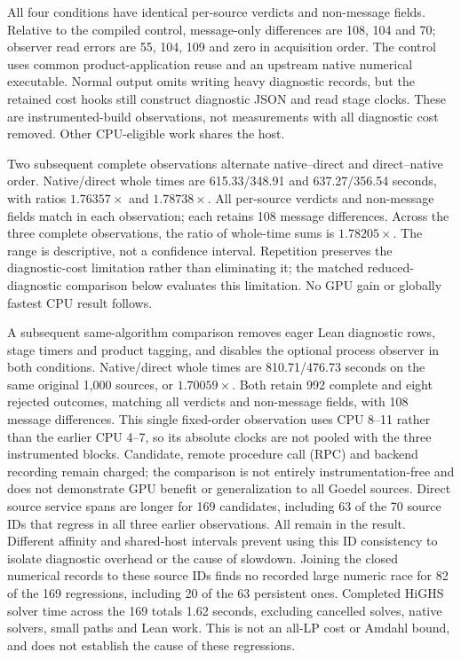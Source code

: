 \documentclass[10pt,twocolumn]{article}
\begin{document}
All four conditions have identical per-source verdicts and non-message fields.
Relative to the compiled control, message-only differences are 108, 104 and 70;
observer read errors are 55, 104, 109 and zero in acquisition order.
The control uses common product-application reuse and an upstream native
numerical executable. Normal output omits writing heavy diagnostic records,
but the retained cost hooks still construct diagnostic JSON and read stage
clocks. These are instrumented-build observations, not measurements with all
diagnostic cost removed. Other CPU-eligible work shares the host.

Two subsequent complete observations alternate native--direct and direct--native
order. Native/direct whole times are 615.33/348.91 and 637.27/356.54 seconds,
with ratios $1.76357\times$ and $1.78738\times$. All per-source verdicts and
non-message fields match in each observation; each retains 108 message
differences. Across the three complete observations, the ratio of whole-time
sums is $1.78205\times$. The range is descriptive, not a confidence interval.
Repetition preserves the diagnostic-cost limitation rather than eliminating it;
the matched reduced-diagnostic comparison below evaluates this limitation.
No GPU gain or globally fastest CPU result follows.

A subsequent same-algorithm comparison removes eager Lean diagnostic rows,
stage timers and product tagging, and disables the optional process observer
in both conditions. Native/direct whole times are 810.71/476.73 seconds on
the same original 1,000 sources, or $1.70059\times$. Both retain 992 complete
and eight rejected outcomes, matching all verdicts and non-message fields,
with 108 message differences. This single fixed-order observation uses CPU
8--11 rather than the earlier CPU 4--7, so its absolute clocks are not pooled
with the three instrumented blocks. Candidate, remote procedure call (RPC) and backend recording
remain charged; the comparison is not entirely instrumentation-free and
does not demonstrate GPU benefit or generalization to all Goedel sources.
Direct source service spans are longer for 169 candidates, including 63 of
the 70 source IDs that regress in all three earlier observations. All remain
in the result. Different affinity and shared-host intervals prevent using
this ID consistency to isolate diagnostic overhead or the cause of slowdown.
Joining the closed numerical records to these source IDs finds no recorded
large numeric race for 82 of the 169 regressions, including 20 of the 63
persistent ones. Completed HiGHS solver time across the 169 totals 1.62
seconds, excluding cancelled solves, native solvers, small paths and Lean
work. This is not an all-LP cost or Amdahl bound, and does not establish the
cause of these regressions.
\end{document}
